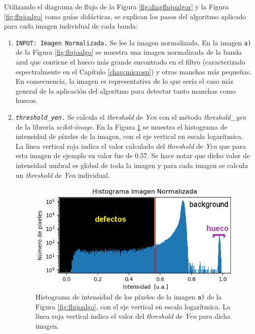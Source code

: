 Utilizando el diagrama de flujo de la Figura \ref{fig:diagflujoalgor} y la Figura \ref{fig:flujoalgo} como guías didácticas, se explican los pasos del algoritmo aplicado para cada imagen individual de cada banda:
\begin{enumerate}
\justifying
\item \texttt{INPUT: Imagen Normalizada.} Se lee la imagen normalizada. En la imagen \texttt{a)} de la Figura \ref{fig:flujoalgo} se muestra una imagen normalizada de la banda azul que contiene el hueco más grande encontrado en el filtro (caracterizado espectralmente en el Capítulo \ref{chap:microsp}) y otras manchas más pequeñas. En consecuencia, la imagen es representativa de lo que sería el caso más general de la aplicación del algoritmo para detectar tanto manchas como huecos. 
\item \texttt{\textit{threshold\_yen}.} Se calcula el \textit{threshold} de \textit{Yen} con el método \textit{threshold\_yen} de la librería \textit{scikit-image}. En la Figura \ref{fig:histalgor} se muestra el histograma de intensidad de píxeles de la imagen, con el eje vertical en escala logarítmica. La línea vertical roja indica el valor calculado del \textit{threshold} de \textit{Yen} que para esta imagen de ejemplo su valor fue de 0.57. Se hace notar que dicho valor de intensidad umbral es global de toda la imagen y para cada imagen se calcula un \textit{threshold} de \textit{Yen} individual.

\begin{figure}[H]	
\centering
\includegraphics[scale=1.65]{Figs/defectosZEISS/hist_algor_agujero.png}
\caption{Histograma de intensidad de los píxeles de la imagen \texttt{a)} de la Figura \ref{fig:flujoalgo}, con el eje vertical en escala logarítmica. La línea roja vertical indica el valor del \textit{threshold} de \textit{Yen} para dicha imagen.}
\label{fig:histalgor}
\end{figure}


\end{enumerate}
